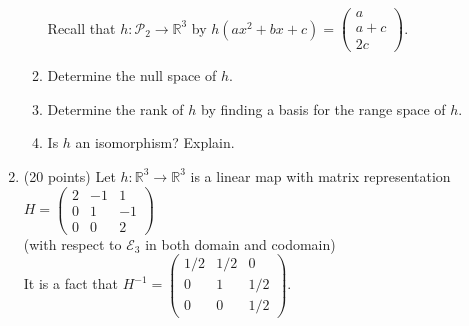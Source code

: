 \documentclass[12pt]{article}
\newcommand{\bpm}{\begin{pmatrix}}
\newcommand{\epm}{\end{pmatrix}}
\begin{document}
\begin{enumerate}
\begin{enumerate}
	Recall that $h: \mathcal{P}_2 \to \mathbb{R}^3$ by $h(ax^2+bx+c)=\bpm a \\ a+c \\ 2c \epm.$ \\
	\item Determine the null space of $h.$
	\vspace{2in}
	\item Determine the rank of $h$ by finding a basis for the range space of $h.$
	\vspace{2in}
	
	\item Is $h$ an isomorphism? Explain.
	\vspace{1in}
	\end{enumerate}
\newpage
\item (20 points) Let $h: \mathbb{R}^3 \to \mathbb{R}^3$ is a linear map with matrix representation $H =\bpm 2&-1&1\\0&1&-1\\0&0&2 \epm$ \\(with respect to $\mathcal{E}_3$ in both domain and codomain)\\
It is a fact that $H^{-1} = \bpm 1/2 & 1/2 & 0\\0&1&1/2 \\ 0&0&1/2\epm.$



\end{enumerate}
\end{document}

